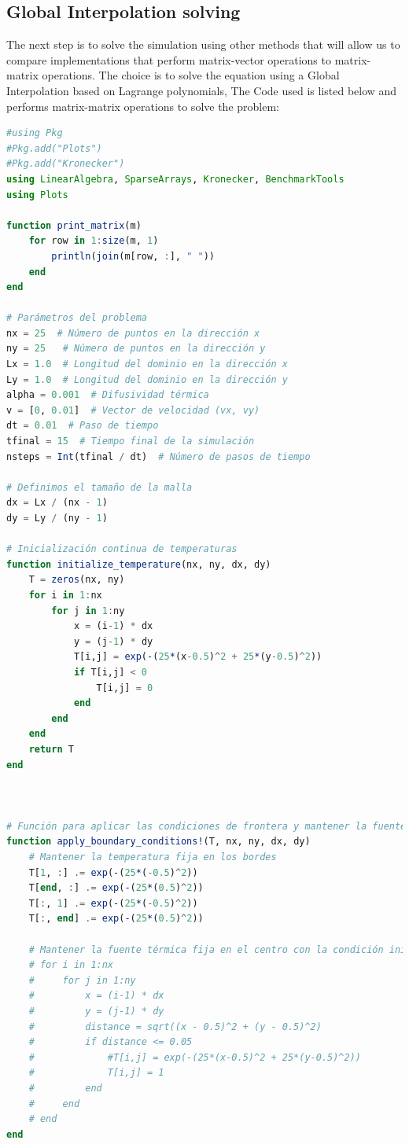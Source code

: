 \clearpage
\subsection{Global Interpolation solving}

The next step is to solve the simulation using other methods that will allow us to compare 
implementations that perform matrix-vector operations to matrix-matrix operations.
The choice is to solve the equation using a Global Interpolation based on Lagrange polynomials, The Code used is listed below and performs matrix-matrix operations to solve the problem: 


\begin{lstlisting}[language=Julia]
#using Pkg
#Pkg.add("Plots")
#Pkg.add("Kronecker")
using LinearAlgebra, SparseArrays, Kronecker, BenchmarkTools
using Plots

function print_matrix(m)
    for row in 1:size(m, 1)
        println(join(m[row, :], " "))
    end
end

# Parámetros del problema
nx = 25  # Número de puntos en la dirección x
ny = 25   # Número de puntos en la dirección y
Lx = 1.0  # Longitud del dominio en la dirección x
Ly = 1.0  # Longitud del dominio en la dirección y
alpha = 0.001  # Difusividad térmica
v = [0, 0.01]  # Vector de velocidad (vx, vy)
dt = 0.01  # Paso de tiempo
tfinal = 15  # Tiempo final de la simulación
nsteps = Int(tfinal / dt)  # Número de pasos de tiempo

# Definimos el tamaño de la malla
dx = Lx / (nx - 1)
dy = Ly / (ny - 1)

# Inicialización continua de temperaturas
function initialize_temperature(nx, ny, dx, dy)
    T = zeros(nx, ny)
    for i in 1:nx
        for j in 1:ny
            x = (i-1) * dx
            y = (j-1) * dy
            T[i,j] = exp(-(25*(x-0.5)^2 + 25*(y-0.5)^2))
            if T[i,j] < 0
                T[i,j] = 0
            end
        end
    end
    return T
end



# Función para aplicar las condiciones de frontera y mantener la fuente térmica fija
function apply_boundary_conditions!(T, nx, ny, dx, dy)
    # Mantener la temperatura fija en los bordes
    T[1, :] .= exp(-(25*(-0.5)^2))
    T[end, :] .= exp(-(25*(0.5)^2))
    T[:, 1] .= exp(-(25*(-0.5)^2))
    T[:, end] .= exp(-(25*(0.5)^2))

    # Mantener la fuente térmica fija en el centro con la condición inicial
    # for i in 1:nx
    #     for j in 1:ny
    #         x = (i-1) * dx
    #         y = (j-1) * dy
    #         distance = sqrt((x - 0.5)^2 + (y - 0.5)^2)
    #         if distance <= 0.05
    #             #T[i,j] = exp(-(25*(x-0.5)^2 + 25*(y-0.5)^2))
    #             T[i,j] = 1
    #         end
    #     end
    # end
end




\end{lstlisting}
